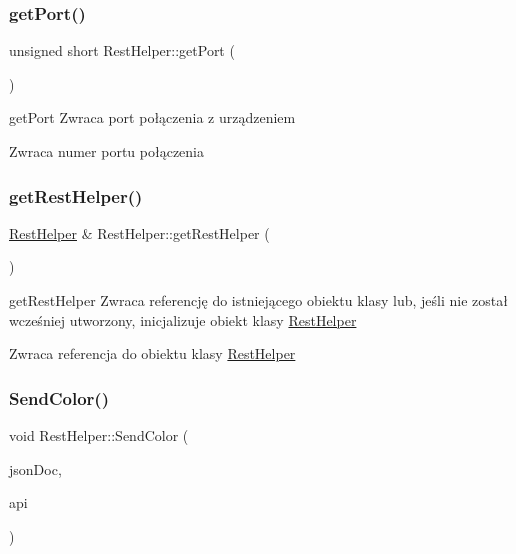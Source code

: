 \subsubsection{\texorpdfstring{get\+Port()}{getPort()}}
{\footnotesize\ttfamily unsigned short Rest\+Helper\+::get\+Port (\begin{DoxyParamCaption}{ }\end{DoxyParamCaption})}



get\+Port Zwraca port połączenia z urządzeniem 

\begin{DoxyReturn}{Zwraca}
numer portu połączenia 
\end{DoxyReturn}
\mbox{\label{class_rest_helper_aac5e384d8056c0d4a6398e83963fb2bf}} 
\subsubsection{\texorpdfstring{get\+Rest\+Helper()}{getRestHelper()}}
{\footnotesize\ttfamily \mbox{\hyperlink{class_rest_helper}{Rest\+Helper}} \& Rest\+Helper\+::get\+Rest\+Helper (\begin{DoxyParamCaption}{ }\end{DoxyParamCaption})\hspace{0.3cm}{\ttfamily [static]}}



get\+Rest\+Helper Zwraca referencję do istniejącego obiektu klasy lub, jeśli nie został wcześniej utworzony, inicjalizuje obiekt klasy \mbox{\hyperlink{class_rest_helper}{Rest\+Helper}} 

\begin{DoxyReturn}{Zwraca}
referencja do obiektu klasy \mbox{\hyperlink{class_rest_helper}{Rest\+Helper}} 
\end{DoxyReturn}
\mbox{\label{class_rest_helper_ab27c5c6fdbe8f25c1b4a288a983f7995}} 
\subsubsection{\texorpdfstring{Send\+Color()}{SendColor()}}
{\footnotesize\ttfamily void Rest\+Helper\+::\+Send\+Color (\begin{DoxyParamCaption}\item[{Q\+Json\+Document}]{json\+Doc,  }\item[{Q\+String}]{api }\end{DoxyParamCaption})}



